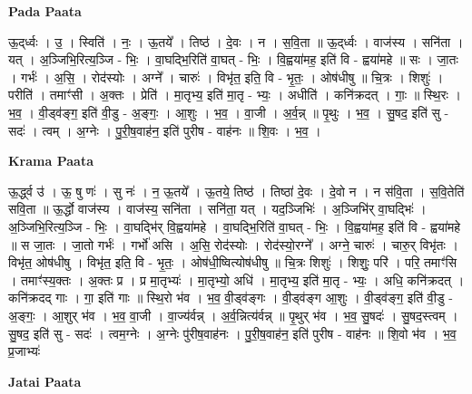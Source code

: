 \documentclass[17pt]{extarticle}
\begin{document}
\textbf{Pada Paata} \newline

ऊ॒द्‌र्ध्वः । उ॒ । स्विति॑ । नः॒ । ऊ॒तये᳚ । तिष्ठ॑ । दे॒वः । न । स॒वि॒ता ॥ ऊ॒द्‌र्ध्वः । वाज॑स्य । सनि॑ता । यत् । अ॒ञ्जिभि॒रित्य॒ञ्जि - भिः॒ । वा॒घद्भि॒रिति॑ वा॒घत् - भिः॒ । वि॒ह्वया॑मह॒ इति॑ वि - ह्वया॑महे ॥ सः । जा॒तः । गर्भः॑ । अ॒सि॒ । रोद॑स्योः । अग्ने᳚ । चारुः॑ । विभृ॑त॒ इति॒ वि - भृ॒तः॒ । ओष॑धीषु ॥ चि॒त्रः । शिशुः॑ । परीति॑ । तमाꣳ॑सी । अ॒क्तः । प्रेति॑ । मा॒तृभ्य॒ इति॑ मा॒तृ - भ्यः॒ । अधीति॑ । कनि॑क्रदत् । गाः॒ ॥ स्थि॒रः । भ॒व॒ । वी॒ड्व॑ङ्ग॒ इति॑ वी॒डु - अ॒ङ्गः॒ । आ॒शुः । भ॒व॒ । वा॒जी । अ॒र्व॒न्न् ॥ पृ॒थुः । भ॒व॒ । सु॒षद॒ इति॑ सु - सदः॑ । त्वम् । अ॒ग्नेः । पु॒री॒ष॒वाह॑न॒ इति॑ पुरीष - वाह॑नः ॥ शि॒वः । भ॒व॒ ।  \newline


\textbf{Krama Paata} \newline

ऊ॒र्द्ध्व उ॑ । ऊ॒ षु णः॑ । सु नः॑ । न॒ ऊ॒तये᳚ । ऊ॒तये॒ तिष्ठ॑ । तिष्ठा॑ दे॒वः । दे॒वो न । न स॑वि॒ता । स॒वि॒तेति॑ सवि॒ता ॥ ऊ॒र्द्धो वाज॑स्य । वाज॑स्य॒ सनि॑ता । सनि॑ता॒ यत् । यद॒ञ्जिभिः॑ । अ॒ञ्जिभि॑र् वा॒घद्भिः॑ । अ॒ञ्जिभि॒रित्य॒ञ्जि - भिः॒ । वा॒घद्भि॑र् वि॒ह्वया॑महे । वा॒घद्भि॒रिति॑ वा॒घत् - भिः॒ । वि॒ह्वया॑मह॒ इति॑ वि - ह्वया॑महे ॥ स जा॒तः । जा॒तो गर्भः॑ । गर्भो॑ असि । अ॒सि॒ रोद॑स्योः । रोद॑स्यो॒रग्ने᳚ । अग्ने॒ चारुः॑ । चारु॒र् विभृ॑तः । विभृ॑त॒ ओष॑धीषु । विभृ॑त॒ इति॒ वि - भृ॒तः॒ । ओष॑धी॒ष्वित्योष॑धीषु ॥ चि॒त्रः शिशुः॑ । शिशुः॒ परि॑ । परि॒ तमाꣳ॑सि । तमाꣳ॑स्य॒क्तः । अ॒क्तः प्र । प्र मा॒तृभ्यः॑ । मा॒तृभ्यो॒ अधि॑ । मा॒तृभ्य॒ इति॑ मा॒तृ - भ्यः॒ । अधि॒ कनि॑क्रदत् । कनि॑क्रदद् गाः । गा॒ इति॑ गाः ॥ स्थि॒रो भ॑व । भ॒व॒ वी॒ड्व॑ङ्गः । वी॒ड्व॑ङ्ग आ॒शुः । वी॒ड्व॑ङ्ग॒ इति॑ वी॒डु - अ॒ङ्गः॒ । आ॒शुर् भ॑व । भ॒व॒ वा॒जी । वा॒ज्य॑र्वन्न् । अ॒र्व॒न्नित्य॑र्वन्न् ॥ पृ॒थुर् भ॑व । भ॒व॒ सु॒षदः॑ । सु॒षद॒स्त्वम् । सु॒षद॒ इति॑ सु - सदः॑ । त्वम॒ग्नेः । अ॒ग्नेः पु॑रीष॒वाह॑नः । पु॒री॒ष॒वाह॑न॒ इति॑ पुरीष - वाह॑नः ॥ शि॒वो भ॑व । भ॒व॒ प्र॒जाभ्यः॑ \newline

\textbf{Jatai Paata} \newline
\end{document}
